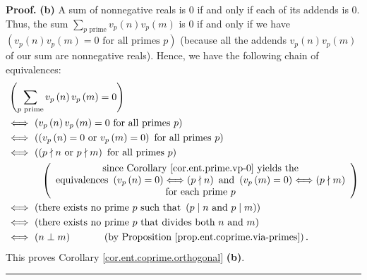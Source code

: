\documentclass[numbers=enddot,12pt,final,onecolumn,notitlepage]{scrartcl}%
\numberwithin{exer}{subsection}
\theoremstyle{definition}
\newenvironment{proof}[1][Proof]{\noindent\textbf{#1.} }{\ \rule{0.5em}{0.5em}}
\let\sumnonlimits\sum
\renewcommand{\sum}{\sumnonlimits\limits}
\begin{document}
\begin{proof}
\textbf{(b)} A sum of nonnegative reals is $0$ if and only if each of its
addends is $0$. Thus, the sum $\sum_{p\text{ prime}}v_{p}\left(  n\right)
v_{p}\left(  m\right)  $ is $0$ if and only if we have $\left(  v_{p}\left(
n\right)  v_{p}\left(  m\right)  =0\text{ for all primes }p\right)  $ (because
all the addends $v_{p}\left(  n\right)  v_{p}\left(  m\right)  $ of our sum
are nonnegative reals). Hence, we have the following chain of equivalences:%
\begin{align*}
&  \left(  \sum_{p\text{ prime}}v_{p}\left(  n\right)  v_{p}\left(  m\right)
=0\right) \\
&  \Longleftrightarrow\ \left(  v_{p}\left(  n\right)  v_{p}\left(  m\right)
=0\text{ for all primes }p\right) \\
&  \Longleftrightarrow\ \left(  \left(  v_{p}\left(  n\right)  =0\text{ or
}v_{p}\left(  m\right)  =0\right)  \text{ for all primes }p\right) \\
&  \Longleftrightarrow\ \left(  \left(  p\nmid n\text{ or }p\nmid m\right)
\text{ for all primes }p\right) \\
&  \ \ \ \ \ \ \ \ \ \ \left(
\begin{array}
[c]{c}%
\text{since Corollary \ref{cor.ent.prime.vp-0} yields the}\\
\text{equivalences }\left(  v_{p}\left(  n\right)  =0\right)
\Longleftrightarrow\left(  p\nmid n\right)  \text{ and }\left(  v_{p}\left(
m\right)  =0\right)  \Longleftrightarrow\left(  p\nmid m\right) \\
\text{for each prime }p
\end{array}
\right) \\
&  \Longleftrightarrow\ \left(  \text{there exists no prime }p\text{ such that
}\left(  p\mid n\text{ and }p\mid m\right)  \right) \\
&  \Longleftrightarrow\ \left(  \text{there exists no prime }p\text{ that
divides both }n\text{ and }m\right) \\
&  \Longleftrightarrow\ \left(  n\perp m\right)  \ \ \ \ \ \ \ \ \ \ \left(
\text{by Proposition \ref{prop.ent.coprime.via-primes}}\right)  .
\end{align*}
This proves Corollary \ref{cor.ent.coprime.orthogonal} \textbf{(b)}.
\end{proof}
\end{document}
